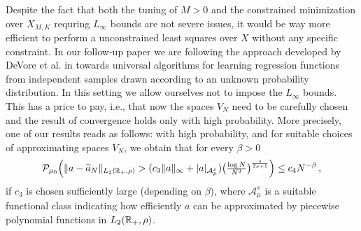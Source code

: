 Despite the fact that both the tuning of $M>0$ and the constrained minimization over $X_{M,K}$  requring $L_\infty$ bounds are not severe issues, it would be way more efficient to perform a unconstrained least squares over $X$ without any specific constraint. In our follow-up paper \cite{bofohamaXX} we are following the approach developed by DeVore et al. in \cite{MR2249856,MR2327596} towards universal algorithms for learning regression functions from independent samples drawn according to an unknown probability distribution. In this setting we allow ourselves not to impose the $L_\infty$ bounds. This has a price to pay, i.e., that now the spaces $V_N$ need to be carefully chosen and the result of convergence holds only with high probability.  More precisely, one of our results reads as follows: with high probability, and for suitable choices of approximating spaces $V_N$, we obtain that for every $\beta>0$
	\begin{equation}\label{finalestimate}
		\mathcal P_{\mu_0} \Bigl(\|a- \widehat a_{N}\|_{L_2(\mathbb{R}_+,\rho)}
			>(c_3\|a\|_\infty+|a|_{\mathcal{A}^s_\mu})\bigl(\tfrac{\log N}{N^3}\bigr)^{\frac{s}{2s+1}}\Bigr)
			\leq c_4 N^{-\beta}\,,
	\end{equation}
	if $c_3$ is chosen sufficiently large (depending on $\beta$), where $\mathcal{A}^s_\mu$ is a suitable functional class indicating how efficiently $a$ can be approximated by piecewise polynomial functions in  $L_2(\mathbb{R}_+,\rho)$.